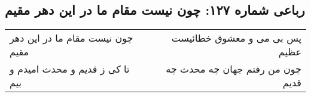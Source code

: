 \begin{center}
\section*{رباعی شماره ۱۲۷: چون نیست مقام ما در این دهر مقیم}
\label{sec:sh127}
\begin{longtable}{l p{0.5cm} r}
چون نیست مقام ما در این دهر مقیم
&&
پس بی می و معشوق خطائیست عظیم
\\
تا کی ز قدیم و محدث امیدم و بیم
&&
چون من رفتم جهان چه محدث چه قدیم
\\
\end{longtable}
\end{center}
